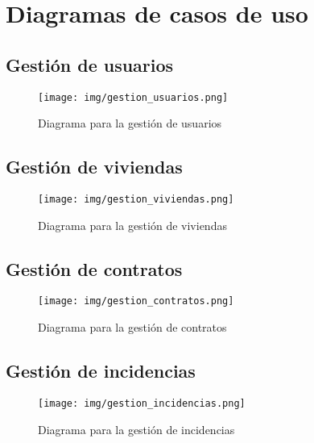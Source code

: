 \chapter{Diagramas de casos de uso}
\section{Gestión de usuarios}\label{DCU1}
\begin{figure}[!h]
  \centering
    \texttt{[image: img/gestion\_usuarios.png]}
    \caption{Diagrama para la gestión de usuarios}
\end{figure}
\pagebreak

\section{Gestión de viviendas}\label{DCU2}
\begin{figure}[!h]
  \centering
    \texttt{[image: img/gestion\_viviendas.png]}
    \caption{Diagrama para la gestión de viviendas}
\end{figure}
\pagebreak

\section{Gestión de contratos}\label{DCU3}
\begin{figure}[!h]
  \centering
    \texttt{[image: img/gestion\_contratos.png]}
    \caption{Diagrama para la gestión de contratos}
\end{figure}

\section{Gestión de incidencias}\label{DCU4}
\begin{figure}[!h]
  \centering
    \texttt{[image: img/gestion\_incidencias.png]}
    \caption{Diagrama para la gestión de incidencias}
\end{figure}